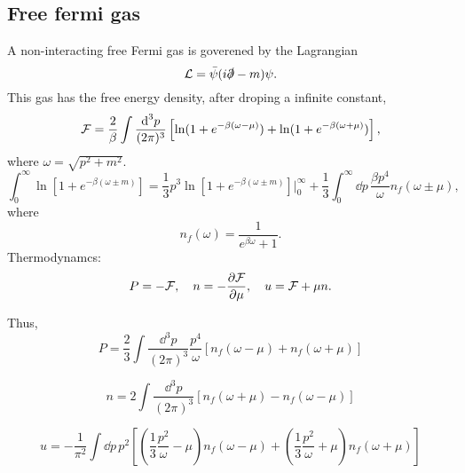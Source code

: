 \subsection*{Free fermi gas}

A non-interacting free Fermi gas is goverened by the Lagrangian
%
\begin{equation}
    \mathcal{L} = \bar \psi (i \slashed \partial - m) \psi.
\end{equation}
%
This gas has the free energy density, after droping a infinite constant, 
%
\begin{equation}
    \mathcal{F} = \frac{2}{\beta}\int \frac{\text{d}^3 p}{(2 \pi)^3} \left[
        \ln(1 + e^{-\beta(\omega - \mu)})
        + 
        \ln(1 + e^{-\beta(\omega + \mu)})
    \right],
\end{equation}
%
where $\omega = \sqrt{p^2 + m^2}$.
%
\begin{equation}
    \int_0^\infty \ln\left[1 + e^{-\beta(\omega \pm m)}\right]
    = 
    \frac{1}{3} p^3\ln\left[1 + e^{-\beta(\omega \pm m)}\right] \bigg |_0^\infty
    + \frac{1}{3} \int_0^\infty \dd p \, \frac{ \beta p^4}{\omega}n_f(\omega \pm \mu),
\end{equation}
%
where
%
\begin{equation}
    n_f(\omega) = \frac{1}{e^{\beta \omega}+1}.
\end{equation}
%
Thermodynamcs:
%
\begin{equation}
    P = - \Eff, \quad n = - \diffp{\Eff}{\mu}, \quad u = \Eff + \mu n.
\end{equation}
%

Thus,
%
\begin{equation}
    P = \frac{2}{3}\int \frac{\dd^3 p}{(2 \pi)^3} 
    \frac{p^4}{\omega}
    [n_f(\omega - \mu) + n_f(\omega + \mu)]
\end{equation}
%

%
\begin{equation}
    n = 2 \int \frac{\dd^3 p}{(2 \pi)^3}
    \left[
        n_f(\omega + \mu)
        -
        n_f(\omega - \mu)
    \right]
\end{equation}
%

%
\begin{equation}
    u
    =
    -\frac{1}{\pi^2}
    \int \dd p \,
    p^2
    \left[
        \left(
            \frac{1}{3}
            \frac{p^2}{\omega}
            -
            \mu
        \right)
        n_f(\omega - \mu)
        +
        \left(
            \frac{1}{3}
            \frac{p^2}{\omega}
            +
            \mu
        \right)
        n_f(\omega + \mu)
    \right]
\end{equation}
%

